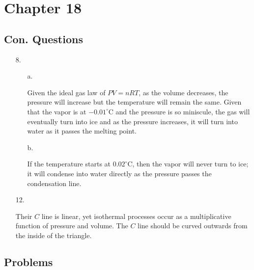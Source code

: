 \documentclass[12pt, letterpaper]{article}
\begin{document}
    \section*{Chapter 18}
    \subsection*{Con. Questions}
    \begin{enumerate}
        \item [8.]
        
        \begin{itemize}
            \item [a.] \mbox{}
            \begin{mdframed}
                Given the ideal gas law of $PV = nRT$, as the volume decreases, the pressure will increase but the temperature will remain the same. Given that the vapor is at $-0.01^{\circ}$C and the pressure is so miniscule, the gas will eventually turn into ice and as the pressure increases, it will turn into water as it passes the melting point.
            \end{mdframed}

            \item[b.] \mbox{}
            \begin{mdframed}
                If the temperature starts at $0.02^{\circ}$C, then the vapor will never turn to ice; it will condense into water directly as the pressure passes the condensation line.
            \end{mdframed}
        \end{itemize}
        \item [12.] \mbox{}
        
        \begin{mdframed}
            Their $C$ line is linear, yet isothermal processes occur as a multiplicative function of pressure and volume. The $C$ line should be curved outwards from the inside of the triangle.
        \end{mdframed}
    \end{enumerate}

    \subsection*{Problems}
\end{document}
